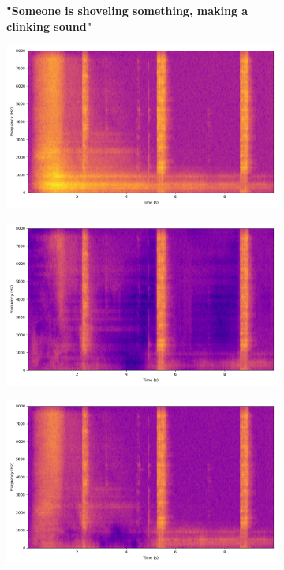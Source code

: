 \begin{figure}[!htbp]
    \begin{subfigure}[b]{0.185\textwidth}
        \centering
        \scriptsize\textbf{"Someone is shoveling something, making a clinking sound"}
        \vspace{5.0mm}
    \end{subfigure}
    \begin{subfigure}[b]{0.185\textwidth}
        \centering
        \includegraphics[width=\textwidth]{plots/onepeace_best_sdri/onepeace mixture_spectrogram.png}
    \end{subfigure}
    \begin{subfigure}[b]{0.185\textwidth}
        \centering
        \includegraphics[width=\textwidth]{plots/onepeace_best_sdri/onepeace sep_spectrogram.png}
    \end{subfigure}
    \begin{subfigure}[b]{0.185\textwidth}
        \centering
        \includegraphics[width=\textwidth]{plots/onepeace_best_sdri/clap sep_spectrogram.png}

\end{subfigure}
\end{figure}
